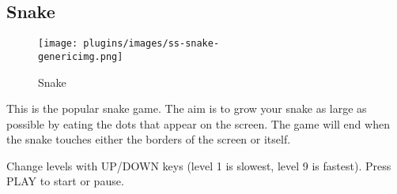 \subsection{Snake}
\begin{figure}[h!]
\begin{center}
\texttt{[image: plugins/images/ss-snake-\\genericimg.png]}
\end{center}
\caption{Snake}
\end{figure}

This is the popular snake game. The aim is to grow your snake as large
as possible by eating the dots that appear on the screen. The game will
end when the snake touches either the borders of the screen or itself.

Change levels with UP/DOWN keys (level 1 is slowest, level 9 is
fastest). Press PLAY to start or pause. 

